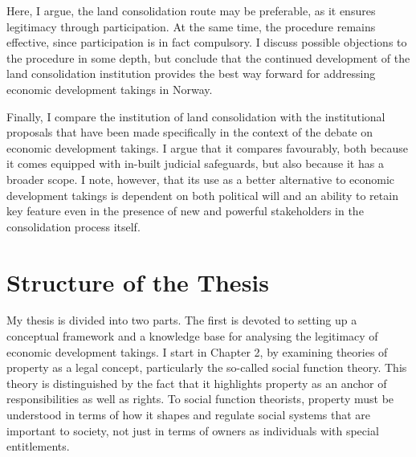 \documentclass{book} %
\newcommand{\noo}[1]{}
\begin{document}
Here, I argue, the land consolidation route may be preferable, as it ensures legitimacy through participation. At the same time, the procedure remains effective, since participation is in fact compulsory. I discuss possible objections to the procedure in some depth, but conclude that the continued development of the land consolidation institution provides the best way forward for addressing economic development takings in Norway.

Finally, I compare the institution of land consolidation with the institutional proposals that have been made specifically in the context of the debate on economic development takings. I argue that it compares favourably, both because it comes equipped with in-built judicial safeguards, but also because it has a broader scope. I note, however, that its use as a better alternative to economic development takings is dependent on both political will and an ability to retain key feature even in the presence of new and powerful stakeholders in the consolidation process itself.

\noo{ In the second part of the thesis, I put the theoretical framework to the test by applying it to a concrete case study, namely that of Norwegian hydropower. Following liberalisation of the energy sector in the early 1990s, hydropower is now a commercial pursuit in Norway. Moreover, there is a long tradition for granting energy producers the power to acquire property compulsorily, including the necessary rights to exploit the energy of water, rights that are subject to private property under Norwegian law. This has resulted in tension and controversy, however, as the original owners of these rights, typically local farmers and small-holders, see the commercial potential of hydropower being transferred to other commercial interests, to the detriment of their own, and their communities', interest in self-governance and economic benefit.}

\section{Structure of the Thesis}

My thesis is divided into two parts. The first is devoted to setting up a conceptual framework and a knowledge base for analysing the legitimacy of economic development takings. I start in Chapter 2, by examining theories of property as a legal concept, particularly the so-called social function theory. This theory is distinguished by the fact that it highlights property as an anchor of responsibilities as well as rights. To social function theorists, property must be understood in terms of how it shapes and regulate social systems that are important to society, not just in terms of owners as individuals with special entitlements.
\end{document}

